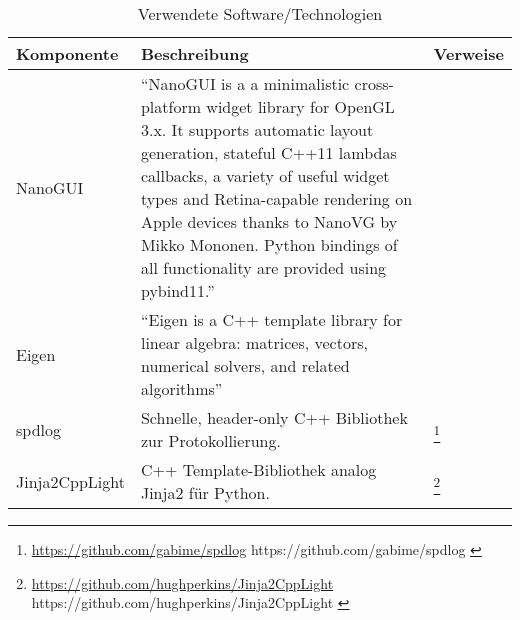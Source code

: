 \begin{longtabu}{p{0.2\textwidth}p{0.7\textwidth}p{0.1\textwidth}}
    \caption{Verwendete
        Software/Technologien}\label{table:prototype:software}\\
    \toprule
    \textbf{Komponente} & \textbf{Beschreibung} & \textbf{Verweise} \\
    \midrule
    NanoGUI    & ``NanoGUI is a a minimalistic cross-platform widget
                             library for OpenGL 3.x. It supports automatic
                             layout generation, stateful C++11 lambdas
                             callbacks, a variety of useful widget types and
                             Retina-capable rendering on Apple devices thanks
                             to NanoVG by Mikko Mononen. Python bindings of all
                             functionality are provided using
                             pybind11.''~\parencite{jakob_wenzel_wjakob/nanogui:_2016}
                           &\protect\footnotemark{}~\protect\footnotemark{}\\


    Eigen      & ``Eigen is a C++ template library for linear
                            algebra: matrices, vectors, numerical solvers, and
                            related algorithms''\parencite{benoit_jacob_eigen_2016}
                           &\protect\footnotemark{}\\

    spdlog     & Schnelle, header-only C++
                           Bibliothek zur Protokollierung.
                           &\footnote{
                               \url{https://github.com/gabime/spdlog}{%
                                   https://github.com/gabime/spdlog
                                }
                            }\\

    Jinja2CppLight & C++ Template-Bibliothek analog
                            Jinja2 für Python.
                           &\footnote{
                               \url{https://github.com/hughperkins/Jinja2CppLight}{%
                                   https://github.com/hughperkins/Jinja2CppLight
                                }
                            }\\
    \bottomrule
\end{longtabu}


